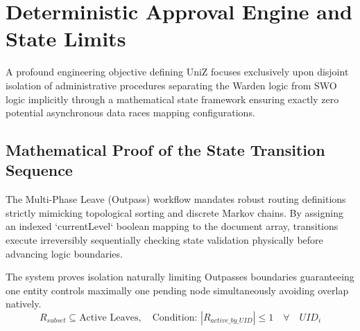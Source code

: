 \documentclass[journal,onecolumn,10pt,draftclsnofoot]{IEEEtran}
\begin{document}
\newpage

\section{Deterministic Approval Engine and State Limits}

A profound engineering objective defining UniZ focuses exclusively upon disjoint isolation of administrative procedures separating the Warden logic from SWO logic implicitly through a mathematical state framework ensuring exactly zero potential asynchronous data races mapping configurations.

\subsection{Mathematical Proof of the State Transition Sequence}
The Multi-Phase Leave (Outpass) workflow mandates robust routing definitions strictly mimicking topological sorting and discrete Markov chains. By assigning an indexed `currentLevel` boolean mapping to the document array, transitions execute irreversibly sequentially checking state validation physically before advancing logic boundaries.

The system proves isolation naturally limiting Outpasses boundaries guaranteeing one entity controls maximally one pending node simultaneously avoiding overlap natively.
\begin{equation}
    R_{subset} \subseteq \text{Active Leaves}, \quad \text{Condition: } |R_{active\_by\_UID}| \leq 1 \quad \forall \quad UID_i
\end{equation}
\end{document}

